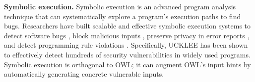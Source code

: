 \noindent
\textbf{Symbolic execution.} Symbolic execution is an advanced program
analysis technique that can systematically explore a program’s
execution paths to find bugs. Researchers have built
scalable and effective symbolic execution systems to detect
software bugs \cite{dart:pldi,cute:fse,godefroid:grammar-fuzzing,godefroid:whitebox-fuzzing,klee:osdi08,yang:malicious-disk:oakland06,cadar:exe:ccs06,s2e:hotdep09,taas:socc10,ramos2015under}, block
malicious inputs \cite{costa:openbsd}, preserve privacy in error reports \cite{castro:bug-report-privacy},
and detect programming rule violations \cite{woodpecker:asplos13}. Specifically,
UCKLEE \cite{ramos2015under} has been shown to effectively detect hundreds
of security vulnerabilities in widely used programs. Symbolic
execution is orthogonal to OWL; it can augment OWL’s input
hints by automatically generating concrete vulnerable inputs.